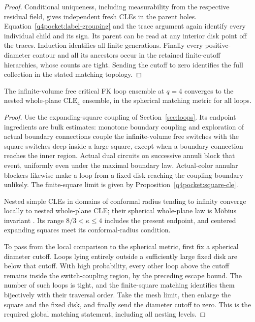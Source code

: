 \begin{proof}
Conditional uniqueness, including measurability from the
respective residual field, gives independent fresh CLEs
in the parent holes.  Equation~\eqref{q4pocket:label-grouping}
and the trace argument again identify every individual child
and its sign.  Its parent can be read at any interior disk
point off the traces.  Induction identifies all finite
generations.  Finally every positive-diameter contour and
all its ancestors occur in the retained finite-cutoff
hierarchies, whose counts are tight.  Sending the cutoff
to zero identifies the full collection in the stated
matching topology.
\end{proof}

\begin{corollary}
\label{q4pocket:whole-plane}
The infinite-volume free critical FK loop ensemble at $q=4$
converges to the nested whole-plane $\mathrm{CLE}_4$ ensemble,
in the spherical matching metric for all loops.
\end{corollary}

\begin{proof}
Use the expanding-square coupling of Section~\ref{sec:loops}.
Its endpoint ingredients are bulk estimates: monotone
boundary coupling and exploration of actual boundary
connections couple the infinite-volume free switches with
the square switches deep inside a large square, except
when a boundary connection reaches the inner region.
Actual dual circuits on successive annuli block that
event, uniformly even under the maximal boundary law.
Actual-color annular blockers likewise make a loop from
a fixed disk reaching the coupling boundary unlikely.
The finite-square limit is given by
Proposition~\ref{q4pocket:square-cle}.

Nested simple CLEs in domains of conformal radius tending
to infinity converge locally to nested whole-plane CLE;
their spherical whole-plane law is M\"obius invariant
\citep[Theorem~1, Proposition~4, and Section~3.2]
{KemppainenWerner2016}.  Its range
$8/3<\kappa\leq4$ includes the present endpoint, and
centered expanding squares meet its conformal-radius
condition.

To pass from the local comparison to the spherical metric,
first fix a spherical diameter cutoff.  Loops lying
entirely outside a sufficiently large fixed disk are below
that cutoff.  With high probability, every other loop
above the cutoff remains inside the switch-coupling region,
by the preceding escape bound.  The number of such loops
is tight, and the finite-square matching identifies them
bijectively with their traversal order.  Take the mesh
limit, then enlarge the square and the fixed disk, and
finally send the diameter cutoff to zero.  This is the
required global matching statement, including all nesting
levels.
\end{proof}

